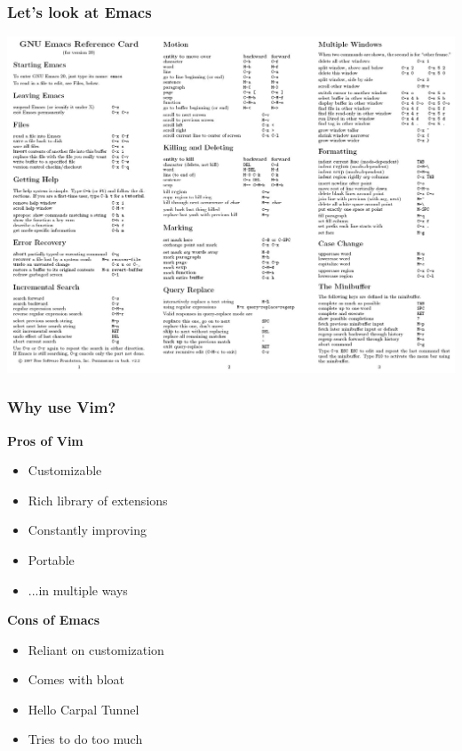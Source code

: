 \documentclass[8pt]{beamer}
\begin{document}
\begin{frame}
  \frametitle{Let's look at Emacs}
  \includegraphics[width=\textwidth]{emacs_cheatsheet.jpg}
\end{frame}

\begin{frame}
  \frametitle{Why use Vim?}
  \begin{multicols}{2}
    \textbf{Pros of Vim}
    \begin{itemize}
      \item Customizable
      \item Rich library of extensions
      \item Constantly improving
      \item Portable
      \item ...in multiple ways
    \end{itemize}
    \columnbreak
    \textbf{Cons of Emacs}
    \begin{itemize}
      \item Reliant on customization
      \item Comes with bloat
      \item Hello Carpal Tunnel
      \item Tries to do too much
    \end{itemize}
  \end{multicols}
\end{frame}
\end{document}
